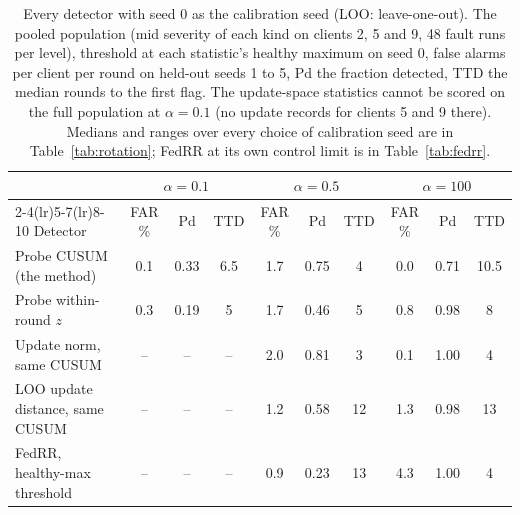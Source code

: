 \begin{table}[t]
\centering
\small
\setlength{\tabcolsep}{3.2pt}
\begin{tabular}{lccccccccc}
\toprule
 & \multicolumn{3}{c}{$\alpha = 0.1$} & \multicolumn{3}{c}{$\alpha = 0.5$} & \multicolumn{3}{c}{$\alpha = 100$} \\
\cmidrule(lr){2-4}\cmidrule(lr){5-7}\cmidrule(lr){8-10}
Detector & FAR \% & Pd & TTD & FAR \% & Pd & TTD & FAR \% & Pd & TTD \\
\midrule
Probe CUSUM (the method) & 0.1 & 0.33 & 6.5 & 1.7 & 0.75 & 4 & 0.0 & 0.71 & 10.5 \\
Probe within-round $z$ & 0.3 & 0.19 & 5 & 1.7 & 0.46 & 5 & 0.8 & 0.98 & 8 \\
Update norm, same CUSUM & -- & -- & -- & 2.0 & 0.81 & 3 & 0.1 & 1.00 & 4 \\
LOO update distance, same CUSUM & -- & -- & -- & 1.2 & 0.58 & 12 & 1.3 & 0.98 & 13 \\
FedRR, healthy-max threshold & -- & -- & -- & 0.9 & 0.23 & 13 & 4.3 & 1.00 & 4 \\
\bottomrule
\end{tabular}
\caption{Every detector with seed 0 as the calibration seed (LOO: leave-one-out). The pooled population (mid severity of each kind on clients 2, 5 and 9, 48 fault runs per level), threshold at each statistic's healthy maximum on seed 0, false alarms per client per round on held-out seeds 1 to 5, Pd the fraction detected, TTD the median rounds to the first flag. The update-space statistics cannot be scored on the full population at $\alpha = 0.1$ (no update records for clients 5 and 9 there). Medians and ranges over every choice of calibration seed are in Table~\ref{tab:rotation}; FedRR at its own control limit is in Table~\ref{tab:fedrr}.}
\label{tab:detectors}
\end{table}
